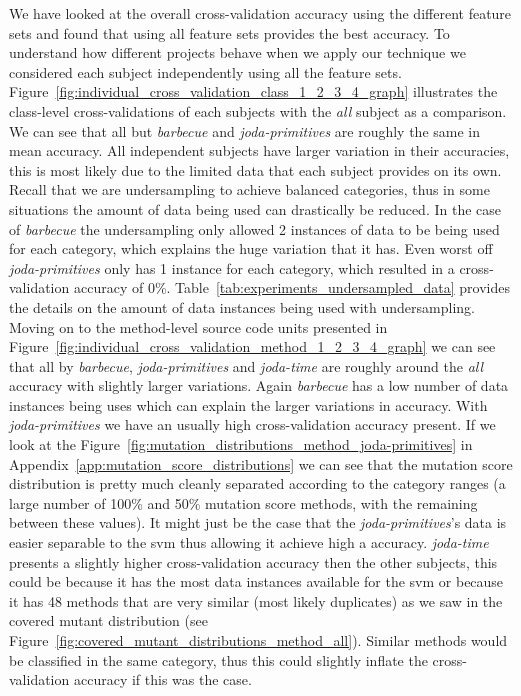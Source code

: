 We have looked at the overall cross-validation accuracy using the different feature sets and found that using all feature sets provides the best accuracy. To understand how different projects behave when we apply our technique we considered each subject independently using all the feature sets. Figure~\ref{fig:individual_cross_validation_class_1_2_3_4_graph} illustrates the class-level cross-validations of each subjects with the \emph{all} subject as a comparison. We can see that all but \emph{barbecue} and \emph{joda-primitives} are roughly the same in mean accuracy. All independent subjects have larger variation in their accuracies, this is most likely due to the limited data that each subject provides on its own. Recall that we are undersampling to achieve balanced categories, thus in some situations the amount of data being used can drastically be reduced. In the case of \emph{barbecue} the undersampling only allowed 2 instances of data to be being used for each category, which explains the huge variation that it has. Even worst off \emph{joda-primitives} only has 1 instance for each category, which resulted in a cross-validation accuracy of 0\%. Table~\ref{tab:experiments_undersampled_data} provides the details on the amount of data instances being used with undersampling. Moving on to the method-level source code units presented in Figure~\ref{fig:individual_cross_validation_method_1_2_3_4_graph} we can see that all by \emph{barbecue}, \emph{joda-primitives} and \emph{joda-time} are roughly around the \emph{all} accuracy with slightly larger variations. Again \emph{barbecue} has a low number of data instances being uses which can explain the larger variations in accuracy. With \emph{joda-primitives} we have an usually high cross-validation accuracy present. If we look at the Figure~\ref{fig:mutation_distributions_method_joda-primitives} in Appendix~\ref{app:mutation_score_distributions} we can see that the mutation score distribution is pretty much cleanly separated according to the category ranges (a large number of 100\% and 50\% mutation score methods, with the remaining between these values). It might just be the case that the \emph{joda-primitives}'s data is easier separable to the \gls{svm} thus allowing it achieve high a accuracy. \emph{joda-time} presents a slightly higher cross-validation accuracy then the other subjects, this could be because it has the most data instances available for the \gls{svm} or because it has 48 methods that are very similar (most likely duplicates) as we saw in the covered mutant distribution (see Figure~\ref{fig:covered_mutant_distributions_method_all}). Similar methods would be classified in the same category, thus this could slightly inflate the cross-validation accuracy if this was the case.


